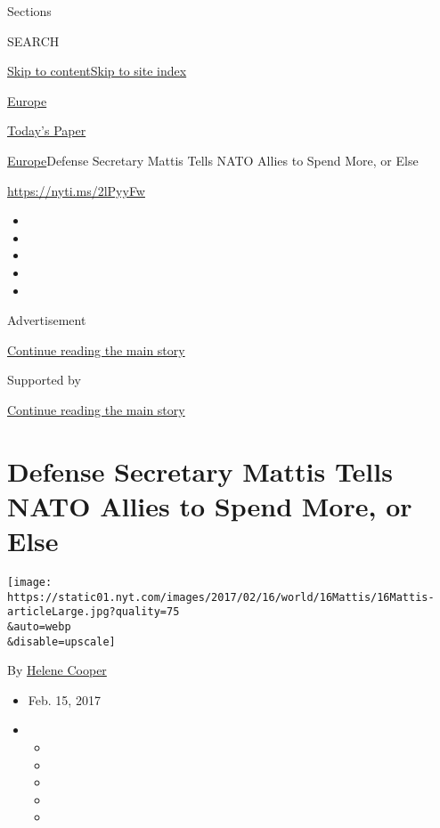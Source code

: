 Sections

SEARCH

\protect\hyperlink{site-content}{Skip to
content}\protect\hyperlink{site-index}{Skip to site index}

\href{https://www.nytimes.com/section/world/europe}{Europe}

\href{https://myaccount.nytimes.com/auth/login?response_type=cookie\&client_id=vi}{}

\href{https://www.nytimes.com/section/todayspaper}{Today's Paper}

\href{/section/world/europe}{Europe}\textbar{}Defense Secretary Mattis
Tells NATO Allies to Spend More, or Else

\url{https://nyti.ms/2lPyyFw}

\begin{itemize}
\item
\item
\item
\item
\item
\end{itemize}

Advertisement

\protect\hyperlink{after-top}{Continue reading the main story}

Supported by

\protect\hyperlink{after-sponsor}{Continue reading the main story}

\hypertarget{defense-secretary-mattis-tells-nato-allies-to-spend-more-or-else}{%
\section{Defense Secretary Mattis Tells NATO Allies to Spend More, or
Else}\label{defense-secretary-mattis-tells-nato-allies-to-spend-more-or-else}}

\texttt{[image: https://static01.nyt.com/images/2017/02/16/world/16Mattis/16Mattis-articleLarge.jpg?quality=75\\\&auto=webp\\\&disable=upscale]}

By \href{http://www.nytimes.com/by/helene-cooper}{Helene Cooper}

\begin{itemize}
\item
  Feb. 15, 2017
\item
  \begin{itemize}
  \item
  \item
  \item
  \item
  \item
  \end{itemize}
\end{itemize}

